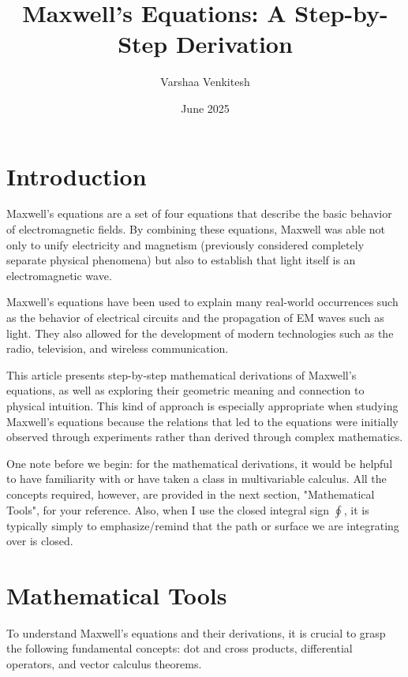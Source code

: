 \documentclass{article}
\title{Maxwell's Equations: A Step-by-Step Derivation}
\author{Varshaa Venkitesh}
\date{June 2025}
\begin{document}
\maketitle

\tableofcontents

\pagebreak
\section{Introduction}
Maxwell's equations are a set of four equations that describe the basic behavior of electromagnetic fields. By combining these equations, Maxwell was able not only to unify electricity and magnetism (previously considered completely separate physical phenomena) but also to establish that light itself is an electromagnetic wave.

\vspace{1em}

Maxwell's equations have been used to explain many real-world occurrences such as the behavior of electrical circuits and the propagation of EM waves such as light. They also allowed for the development of modern technologies such as the radio, television, and wireless communication.

\vspace{1em}

This article presents step-by-step mathematical derivations of Maxwell's equations, as well as exploring their geometric meaning and connection to physical intuition. This kind of approach is especially appropriate when studying Maxwell's equations because the relations that led to the equations were initially observed through experiments rather than derived through complex mathematics.

\vspace{1em}
One note before we begin: for the mathematical derivations, it would be helpful to have familiarity with or have taken a class in multivariable calculus. All the concepts required, however, are provided in the next section, "Mathematical Tools", for your reference. Also, when I use the closed integral sign $\oint$, it is typically simply to emphasize/remind that the path or surface we are integrating over is closed.

\pagebreak
\section{Mathematical Tools}

To understand Maxwell's equations and their derivations, it is crucial to grasp the following fundamental concepts: dot and cross products, differential operators, and vector calculus theorems.
\end{document}
